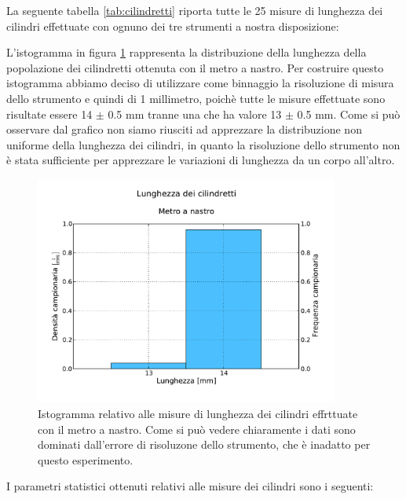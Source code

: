 La seguente tabella \ref{tab:cilindretti} riporta tutte le 25 misure di
lunghezza dei cilindri effettuate con ognuno dei tre strumenti a nostra
disposizione:

L'istogramma in figura \ref{fig:metro} rappresenta la distribuzione della lunghezza della
popolazione dei cilindretti ottenuta con il metro a nastro. Per costruire
questo istogramma abbiamo deciso di utilizzare come binnaggio la risoluzione
di misura dello strumento e quindi di 1 millimetro, poichè tutte le misure
effettuate sono risultate essere 14 $\pm$ 0.5 mm tranne una che ha valore
13 $\pm$ 0.5 mm. Come si può osservare dal grafico non siamo riusciti ad
apprezzare la distribuzione non uniforme della lunghezza dei cilindri,
in quanto la risoluzione dello strumento non è stata sufficiente per
apprezzare le variazioni di lunghezza da un corpo all'altro.

\begin{figure}
	\centering
	\includegraphics[width=100mm]{grafici/Cilindretti_metro.pdf}
	\caption{Istogramma relativo alle misure di lunghezza dei cilindri effrttuate con il
        metro a nastro. Come si può vedere chiaramente i dati sono dominati dall'errore di
        risoluzone dello strumento, che è inadatto per questo esperimento.}
	\label{fig:metro}
\end{figure}

I parametri statistici ottenuti relativi alle misure dei cilindri sono
i seguenti:

